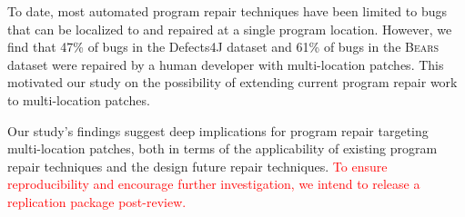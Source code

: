 \documentclass[10pt, conference]{IEEEtran}
\newcommand\todo[1]{\textcolor{red}{#1}}
\newcommand\bears{\textsc{Bears}\xspace}
\begin{document}
To date, most automated program repair techniques have been limited to bugs that
can be localized to and repaired at a single program location. However, we find
that 47\% of bugs in the Defects4J dataset and 61\% of bugs in the \bears dataset
were repaired by a human developer with multi-location patches. This motivated
our study on the possibility of extending current program repair work to
multi-location patches.

Our study's findings suggest deep implications for program repair targeting
multi-location patches, both in terms of the applicability of existing program
repair techniques and the design future repair techniques. \todo{To ensure
reproducibility and encourage further investigation, we intend to release a
replication package post-review.}



\end{document}
